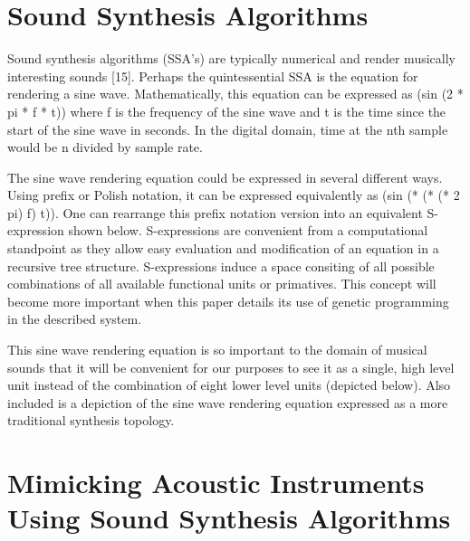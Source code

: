 \documentclass[12pt]{article}
\begin{document}
\section{Sound Synthesis Algorithms}
Sound synthesis algorithms (SSA's) are typically numerical and render musically interesting sounds [15]. Perhaps the quintessential SSA is the equation for rendering a sine wave. Mathematically, this equation can be expressed as (sin (2 * pi * f * t)) where f is the frequency of the sine wave and t is the time since the start of the sine wave in seconds. In the digital domain, time at the nth sample would be n divided by sample rate.
	
The sine wave rendering equation could be expressed in several different ways. Using prefix or Polish notation, it can be expressed equivalently as (sin (* (* (* 2 pi) f) t)). One can rearrange this prefix notation version into an equivalent S-expression shown below. S-expressions are convenient from a computational standpoint as they allow easy evaluation and modification of an equation in a recursive tree structure. S-expressions induce a space consiting of all possible combinations of all available functional units or primatives. This concept will become more important when this paper details its use of genetic programming in the described system.
	
This sine wave rendering equation is so important to the domain of musical sounds that it will be convenient for our purposes to see it as a single, high level unit instead of the combination of eight lower level units (depicted below). Also included is a depiction of the sine wave rendering equation expressed as a more traditional synthesis topology.
	
\section{Mimicking Acoustic Instruments Using Sound Synthesis Algorithms}
\end{document}
